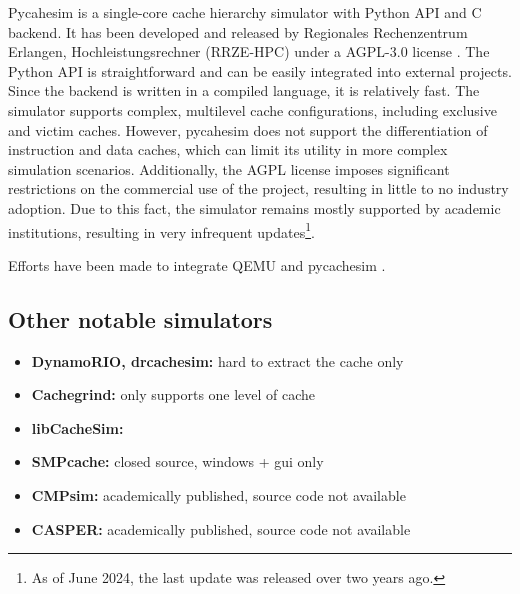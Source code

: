 Pycahesim is a single-core cache hierarchy simulator with Python API and C backend. It has been developed and released by Regionales Rechenzentrum Erlangen, Hochleistungsrechner (RRZE-HPC)
under a AGPL-3.0 license \cite{pycachesim}. The Python API is straightforward and can be easily integrated into external projects. Since the backend is written in a compiled language, it is
relatively fast. The simulator supports complex, multilevel cache configurations, including exclusive and victim caches. %
However, pycahesim does not support the differentiation of instruction and data caches, which can limit its utility in more complex simulation scenarios. Additionally, the AGPL
license imposes significant restrictions on the commercial use of the project, resulting in little to no industry adoption. Due to this fact, the simulator remains mostly supported
by academic institutions, resulting in very infrequent updates\footnote{As of June 2024, the last update was released over two years ago.}.

\vspace{10px}
\noindent Efforts have been made to integrate QEMU and pycachesim \cite{pycachesimqemu}.

\subsection{Other notable simulators}
\begin{itemize}
	\item \textbf{DynamoRIO, drcachesim:} hard to extract the cache only
	\item \textbf{Cachegrind:} only supports one level of cache
	\item \textbf{libCacheSim:}
	\item \textbf{SMPcache:} closed source, windows + gui only
	\item \textbf{CMPsim:} academically published, source code not available
	\item \textbf{CASPER:} academically published, source code not available
\end{itemize}
